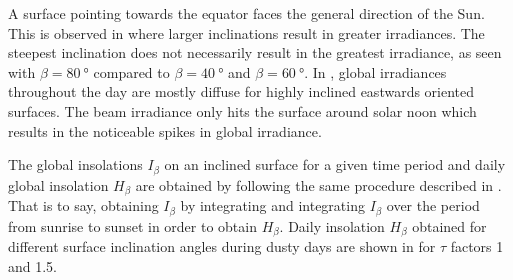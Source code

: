 A surface pointing towards the equator faces the general direction of the Sun. This is observed in  where larger inclinations result in greater irradiances. The steepest inclination does not necessarily result in the greatest irradiance, as seen with $\beta = \SI{80}{\degree}$ compared to $\beta = \SI{40}{\degree}$ and $\beta = \SI{60}{\degree}$. In , global irradiances throughout the day are mostly diffuse for highly inclined eastwards oriented surfaces. The beam irradiance only hits the surface around solar noon which results in the noticeable spikes in global irradiance.

The global insolations $I_{\beta}$ on an inclined surface for a given time period and daily global insolation $H_{\beta}$ are obtained by following the same procedure described in . That is to say, obtaining $I_{\beta}$ by integrating  and integrating $I_{\beta}$ over the period from sunrise to sunset in order to obtain $H_{\beta}$. Daily insolation $H_{\beta}$ obtained for different surface inclination angles during dusty days are shown in  for $\tau$ factors 1 and 1.5.

